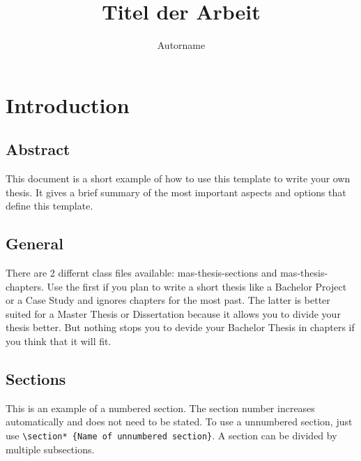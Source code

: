 \documentclass[bachelorarbeit,grey,english]{mas-thesis-sections}				%
\author{Autorname}
\title{Titel der Arbeit}
\begin{document}
\maketitle				%

\cleardoublepage

\tableofcontents		%

\cleardoublepage

\listofillustrations	%


\cleardoublepage

\setcounter{page}{1}

\chapter{Introduction}	%

\section{Abstract}

This document is a short example of how to use this template to write your own thesis. It gives a brief summary of the most important aspects and options that define this template.

\newpage


\section{General}

There are 2 differnt class files available: mas-thesis-sections and mas-thesis-chapters. Use the first if you plan to write a short thesis like a Bachelor Project or a Case Study and ignores chapters for the most past. The latter is better suited for a Master Thesis or Dissertation because it allows you to divide your thesis better. But nothing stops you to devide your Bachelor Thesis in chapters if you think that it will fit.

\newpage


\section{Sections}

This is an example of a numbered section. The section number increases automatically and does not need to be stated. To use a unnumbered section, just use {\tt \textbackslash section* \{Name of unnumbered section\}}. A section can be divided by multiple subsections.
\end{document}
